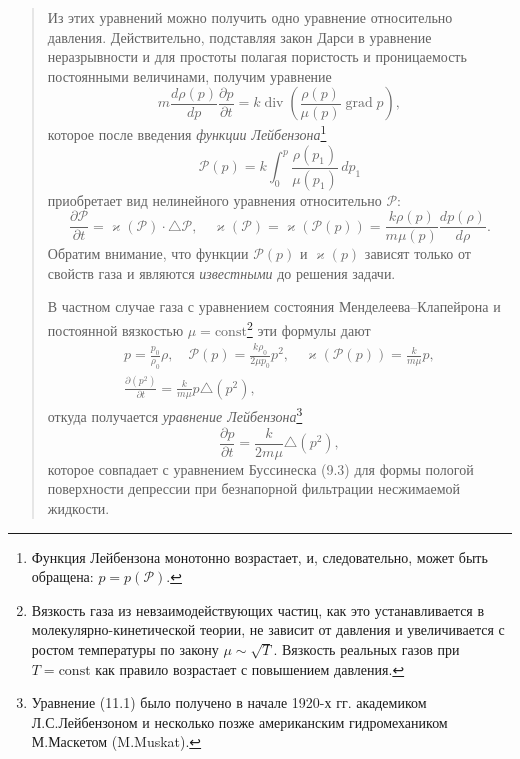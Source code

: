\documentclass[12pt,a4paper]{article}
\DeclareMathOperator{\grad}{grad}
\DeclareMathOperator{\Div}{div}
\begin{document}
\begin{quote}\sloppy
Из этих уравнений можно получить одно уравнение относительно давления. Действительно, подставляя закон Дарси в уравнение неразрывности и для простоты полагая пористость и проницаемость постоянными величинами, получим уравнение
\[m\frac{d\rho(p)}{dp}\frac{\partial p}{\partial t}=k\Div\left(\frac{\rho(p)}{\mu(p)}\grad p\right),\]
которое после введения \textit{функции Лейбензона}\setcounter{footnote}{0}\footnote{Функция Лейбензона монотонно возрастает, и, следовательно, может быть обращена: $p=p(\mathscr{P})$.}
\[\mathscr{P}(p)=k\int_0^p\frac{\rho(p_1)}{\mu(p_1)}\,dp_1\]
приобретает вид нелинейного уравнения относительно $\mathscr{P}$:
\[\frac{\partial\mathscr{P}}{\partial t}=\varkappa(\mathscr{P})\cdot\triangle\mathscr{P},\quad\varkappa(\mathscr{P})=\varkappa(\mathscr{P}(p))=\frac{k\rho(p)}{m\mu(p)}\frac{dp(\rho)}{d\rho}.\]
Обратим внимание, что функции $\mathscr{P}(p)$ и $\varkappa(p)$ зависят только от свойств газа и являются \textit{известными} до решения задачи.

В частном случае газа с уравнением состояния Менделеева--Клапейрона и постоянной вязкостью $\mu=\mathrm{const}$\footnote{Вязкость газа из невзаимодействующих частиц, как это устанавливается в молекулярно-кинетической теории, не зависит от давления и увеличивается с ростом температуры по закону $\mu\sim\sqrt T$. Вязкость реальных газов при $T=\mathrm{const}$ как правило возрастает с повышением давления.} эти формулы дают
\[\begin{gathered}
p=\frac{p_0}{\rho_0}\rho,\quad\mathscr{P}(p)=\frac{k\rho_0}{2\mu p_0}p^2,\quad\varkappa(\mathscr{P}(p))=\frac{k}{m\mu}p,\\
\frac{\partial(p^2)}{\partial t}=\frac{k}{m\mu}p\triangle(p^2),
\end{gathered}\]
откуда получается \textit{уравнение Лейбензона}\footnote{Уравнение (11.1) было получено в начале 1920-х гг. академиком Л.С.Лейбензоном и несколько позже американским гидромехаником М.Маскетом (M.Muskat).}
\begin{equation}\frac{\partial p}{\partial t}=\frac{k}{2m\mu}\triangle(p^2),\tag{11.1}\label{q7:eq-11-1}\end{equation}
которое совпадает с уравнением Буссинеска (9.3) для формы пологой поверхности депрессии при безнапорной фильтрации несжимаемой жидкости.
\par\nobreak{}\par
\end{quote}
\end{document}
